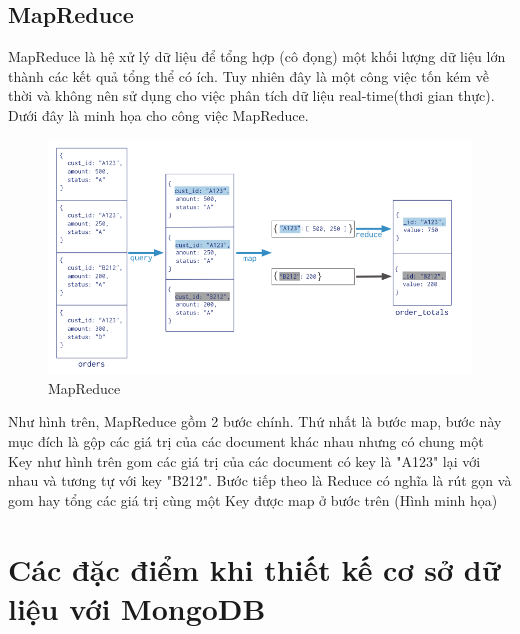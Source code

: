 \subsection{MapReduce}
MapReduce là hệ xử lý dữ liệu để tổng hợp (cô đọng) một khối lượng dữ liệu lớn thành các kết quả tổng thể có ích. Tuy nhiên đây là một công việc tốn kém về thời và không nên sử dụng cho việc phân tích dữ liệu real-time(thơi gian thực). Dưới đây là minh họa cho công việc MapReduce.\\
\begin{figure}[h!]
		\centering
		\includegraphics[scale=0.5]{charts/mapreduce.png}
		\caption{MapReduce}
		\label{fig:mapreduce}
\end{figure}
Như hình trên, MapReduce gồm 2 bước chính. Thứ nhất là bước map, bước này mục đích là gộp các giá trị của các document khác nhau nhưng có chung một Key như hình trên gom các giá trị của các document có key là "A123" lại với nhau và tương tự với key "B212". Bước tiếp theo là Reduce có nghĩa là rút gọn và gom hay tổng các giá trị cùng một Key được map ở bước trên (Hình minh họa)


\section{Các đặc điểm khi thiết kế cơ sở dữ liệu với MongoDB}
